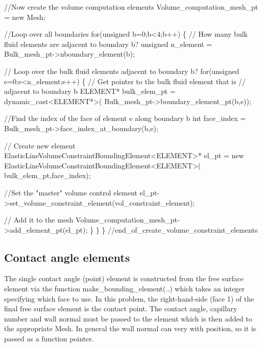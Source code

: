 \begin{DoxyCodeInclude}
  
  \textcolor{comment}{//Now create the volume computation elements}
  Volume\_computation\_mesh\_pt = \textcolor{keyword}{new} Mesh;

  \textcolor{comment}{//Loop over all boundaries}
  \textcolor{keywordflow}{for}(\textcolor{keywordtype}{unsigned} b=0;b<4;b++)
   \{
    \textcolor{comment}{// How many bulk fluid elements are adjacent to boundary b?}
    \textcolor{keywordtype}{unsigned} n\_element = Bulk\_mesh\_pt->nboundary\_element(b);
    
    \textcolor{comment}{// Loop over the bulk fluid elements adjacent to boundary b?}
    \textcolor{keywordflow}{for}(\textcolor{keywordtype}{unsigned} e=0;e<n\_element;e++)
     \{
      \textcolor{comment}{// Get pointer to the bulk fluid element that is }
      \textcolor{comment}{// adjacent to boundary b}
      ELEMENT* bulk\_elem\_pt = \textcolor{keyword}{dynamic\_cast<}ELEMENT*\textcolor{keyword}{>}(
       Bulk\_mesh\_pt->boundary\_element\_pt(b,e));
      
      \textcolor{comment}{//Find the index of the face of element e along boundary b}
      \textcolor{keywordtype}{int} face\_index = Bulk\_mesh\_pt->face\_index\_at\_boundary(b,e);
      
      \textcolor{comment}{// Create new element}
      ElasticLineVolumeConstraintBoundingElement<ELEMENT>* el\_pt =
       \textcolor{keyword}{new} ElasticLineVolumeConstraintBoundingElement<ELEMENT>(
        bulk\_elem\_pt,face\_index);   

      \textcolor{comment}{//Set the "master" volume control element}
      el\_pt->set\_volume\_constraint\_element(vol\_constraint\_element);
     
      \textcolor{comment}{// Add it to the mesh}
      Volume\_computation\_mesh\_pt->add\_element\_pt(el\_pt);     
     \}
   \}
\} \textcolor{comment}{//end\_of\_create\_volume\_constraint\_elements}

\end{DoxyCodeInclude}
\hypertarget{index_contact}{}\subsection{Contact angle elements}\label{index_contact}
The single contact angle (point) element is constructed from the free surface element via the function {\ttfamily make\+\_\+bounding\+\_\+element}(..) which takes an integer specifying which face to use. In this problem, the right-\/hand-\/side (face 1) of the final free surface element is the contact point. The contact angle, capillary number and wall normal must be passed to the element which is then added to the appropriate {\ttfamily Mesh}. In general the wall normal can very with position, so it is passed as a function pointer.


